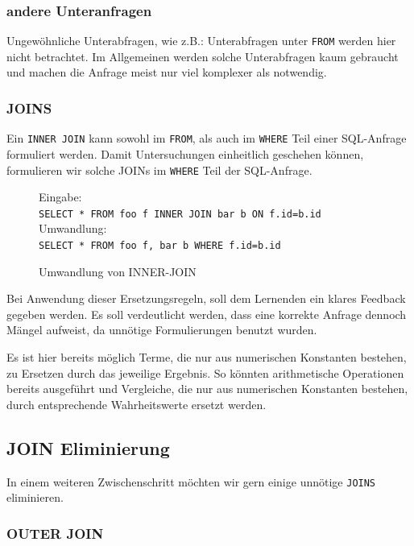 \subsubsection{andere Unteranfragen}

Ungewöhnliche Unterabfragen, wie z.B.: Unterabfragen unter \verb|FROM| werden hier nicht betrachtet. Im Allgemeinen werden solche Unterabfragen kaum gebraucht und machen die Anfrage meist nur viel komplexer als notwendig.

\subsubsection{JOINS}
Ein \verb|INNER JOIN| kann sowohl im \verb|FROM|, als auch im \verb|WHERE| Teil einer SQL-Anfrage formuliert werden. Damit Untersuchungen einheitlich geschehen können, formulieren wir solche JOINs im \verb|WHERE| Teil der SQL-Anfrage.

\begin{figure}[h]
Eingabe:\\
\verb|SELECT * FROM foo f INNER JOIN bar b ON f.id=b.id|\\

Umwandlung:\\
\verb|SELECT * FROM foo f, bar b WHERE f.id=b.id|\\
\caption{Umwandlung von INNER-JOIN}
\end{figure}

Bei Anwendung dieser Ersetzungsregeln, soll dem Lernenden ein klares Feedback gegeben werden. Es soll verdeutlicht werden, dass eine korrekte Anfrage dennoch Mängel aufweist, da unnötige Formulierungen benutzt wurden.

Es ist hier bereits möglich Terme, die nur aus numerischen Konstanten bestehen, zu Ersetzen durch das jeweilige Ergebnis. So könnten arithmetische Operationen bereits ausgeführt und Vergleiche, die nur aus numerischen Konstanten bestehen, durch entsprechende Wahrheitswerte ersetzt werden.

\subsection{JOIN Eliminierung}

In einem weiteren Zwischenschritt möchten wir gern einige unnötige \verb|JOINS| eliminieren.

\subsubsection{OUTER JOIN}

